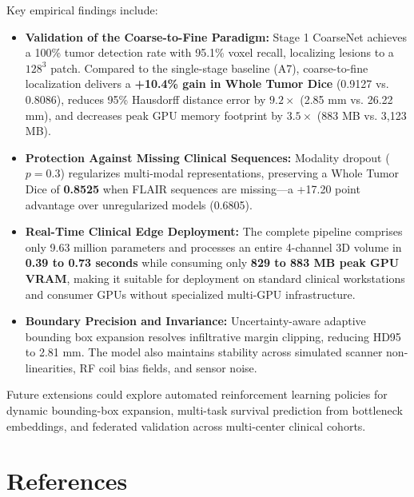\documentclass[12pt, a4paper]{article}
\begin{document}
Key empirical findings include:
\begin{itemize}[leftmargin=*, itemsep=4pt]
    \item \textbf{Validation of the Coarse-to-Fine Paradigm:} Stage 1 CoarseNet achieves a 100\% tumor detection rate with 95.1\% voxel recall, localizing lesions to a $128^3$ patch. Compared to the single-stage baseline (A7), coarse-to-fine localization delivers a \textbf{+10.4\% gain in Whole Tumor Dice} (0.9127 vs. 0.8086), reduces 95\% Hausdorff distance error by \textbf{$9.2\times$} (2.85 mm vs. 26.22 mm), and decreases peak GPU memory footprint by \textbf{$3.5\times$} (883 MB vs. 3,123 MB).
    \item \textbf{Protection Against Missing Clinical Sequences:} Modality dropout ($p=0.3$) regularizes multi-modal representations, preserving a Whole Tumor Dice of \textbf{0.8525} when FLAIR sequences are missing---a +17.20 point advantage over unregularized models (0.6805).
    \item \textbf{Real-Time Clinical Edge Deployment:} The complete pipeline comprises only 9.63 million parameters and processes an entire 4-channel 3D volume in \textbf{0.39 to 0.73 seconds} while consuming only \textbf{829 to 883 MB peak GPU VRAM}, making it suitable for deployment on standard clinical workstations and consumer GPUs without specialized multi-GPU infrastructure.
    \item \textbf{Boundary Precision and Invariance:} Uncertainty-aware adaptive bounding box expansion resolves infiltrative margin clipping, reducing HD95 to 2.81 mm. The model also maintains stability across simulated scanner non-linearities, RF coil bias fields, and sensor noise.
\end{itemize}

Future extensions could explore automated reinforcement learning policies for dynamic bounding-box expansion, multi-task survival prediction from bottleneck embeddings, and federated validation across multi-center clinical cohorts.

\section{References}
\begingroup
\renewcommand{\section}[2]{}


\endgroup
\end{document}
